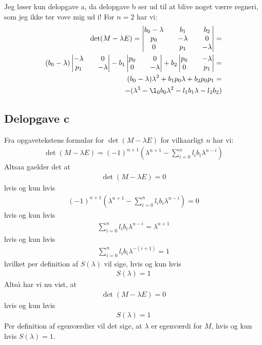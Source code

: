 \documentclass[12pt]{article}
\begin{document}
Jeg løser kun delopgave a, da delopgave b ser ud til at blive noget værre regneri, som jeg ikke tør vove mig ud i! For $n=2$ har vi:
\begin{align}
\det(M-\lambda E) =
\begin{vmatrix}
b_0 - \lambda && b_1 && b_2 \\
p_0 && -\lambda && 0 \\
0 && p_1 && -\lambda 
\end{vmatrix} = \\
(b_0 - \lambda) \begin{vmatrix}
-\lambda && 0 \\
p_1 && -\lambda  
\end{vmatrix} - b_1 \begin{vmatrix}
p_0 && 0 \\
0 && -\lambda  
\end{vmatrix} + 
b_2 \begin{vmatrix}
p_0 && -\lambda \\
0 && p_1  
\end{vmatrix} = \\
(b_0 - \lambda)\lambda^2 
+ b_1p_0\lambda  + 
b_2 p_0 p_1 = \\
-(\lambda^3 - \l_0b_0\lambda^2 - l_1b_1\lambda - l_2 b_2)
\end{align}

\subsection{Delopgave c}

Fra opgavetekstens formular for $\det(M-\lambda E)$ for vilkaarligt $n$ har vi:
\begin{align}
\det(M-\lambda E) = (-1)^{n+1}\left(\lambda^{n+1} - \sum_{i=0}^n l_ib_i\lambda^{n-i} \right)
\end{align}
Altsaa gaelder det at
\begin{align}
\det(M-\lambda E) = 0
\end{align}
hvis og kun hvis
\begin{align}
 (-1)^{n+1}\left(\lambda^{n+1} - \sum_{i=0}^n l_ib_i\lambda^{n-i} \right) = 0
\end{align}
hvis og kun hvis
\begin{align}
\sum_{i=0}^n l_ib_i\lambda^{n-i} = \lambda^{n+1}
\end{align}
hvis og kun hvis
\begin{align}
\sum_{i=0}^n l_ib_i\lambda^{-(i+1)} = 1
\end{align}
hvilket per definition af $S(\lambda)$ vil sige, hvis og kun hvis
\begin{align}
S(\lambda) = 1
\end{align}
Altså har vi nu vist, at 
\begin{align}
\det(M-\lambda E) = 0
\end{align}
hvis og kun hvis 
\begin{align}
S(\lambda) = 1
\end{align}
Per definition af egenværdier vil det sige, at $\lambda$ er egenværdi for $M$, hvis og kun hvis $S(\lambda)=1$.
\end{document}
